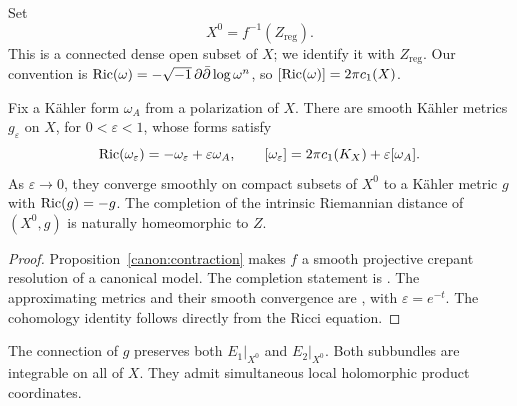 Set
\[
 X^0=f^{-1}(Z_{\mathrm{reg}}).
\]
This is a connected dense open subset of \(X\); we identify it with
\(Z_{\mathrm{reg}}\).  Our convention is
\(\operatorname{Ric}(\omega)=-\sqrt{-1}\,\partial\bar\partial\log\omega^n\),
so \([\operatorname{Ric}(\omega)]=2\pi c_1(X)\).

\begin{lemma}\label{canon:metric-input}
Fix a Kähler form \(\omega_A\) from a polarization of \(X\).
There are smooth Kähler metrics \(g_\varepsilon\) on \(X\), for
\(0<\varepsilon<1\), whose forms satisfy
\[
 \operatorname{Ric}(\omega_\varepsilon)
       =-\omega_\varepsilon+\varepsilon\omega_A,
 \qquad
 [\omega_\varepsilon]
       =2\pi c_1(K_X)+\varepsilon[\omega_A].
\]
As \(\varepsilon\to0\), they converge smoothly on compact subsets of
\(X^0\) to a Kähler metric \(g\) with \(\operatorname{Ric}(g)=-g\).
The completion of the intrinsic Riemannian distance of
\((X^0,g)\) is naturally homeomorphic to \(Z\).
\end{lemma}

\begin{proof}
Proposition~\ref{canon:contraction} makes \(f\) a smooth projective
crepant resolution of a canonical model.  The completion statement is
\cite[Theorem~1.2]{Song14}.  The approximating metrics and their smooth
convergence are \cite[Equation~(4.28) and Lemma~4.1]{Song14}, with
\(\varepsilon=e^{-t}\).  The cohomology identity follows directly from
the Ricci equation.
\end{proof}

\begin{proposition}\label{canon:parallel}
The connection of \(g\) preserves both \(E_1|_{X^0}\) and
\(E_2|_{X^0}\).  Both subbundles are integrable on all of \(X\).
They admit simultaneous local holomorphic product coordinates.
\end{proposition}

